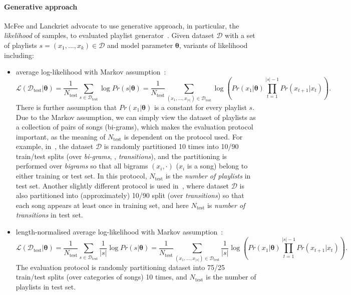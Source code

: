 \paragraph{Generative approach}
McFee and Lanckriet advocate to use generative approach, in particular, the \emph{likelihood} of samples, 
to evaluated playlist generator~\cite{mcfee2011natural}.
Given dataset $\mathcal{D}$ with a set of playlists $s=(x_1, \dots, x_k) \in \mathcal{D}$ and model parameter $\bm{\theta}$, 
variants of likelihood including:
\begin{itemize}
\item average log-likelihood with Markov assumption~\cite{mcfee2011natural,chen2012playlist}:
      \begin{equation*}
      \mathcal{L}(\mathcal{D}_\text{test} | \bm{\theta}) 
      = \frac{1}{N_\text{test}} \sum_{s \in \mathcal{D}_\text{test}} \log Pr(s | \bm{\theta})
      = \frac{1}{N_\text{test}} \sum_{(x_1,\dots,x_{|s|}) \in \mathcal{D}_\text{test}} 
        \log \left( Pr(x_1 |\bm{\theta}) \prod_{t=1}^{|s|-1} Pr(x_{t+1} | x_t) \right).
      \end{equation*}
      There is further assumption that $Pr(x_1 |\bm{\theta})$ is a constant for every playlist $s$.
      Due to the Markov assumption, we can simply view the dataset of playlists as a collection of pairs of songs (bi-grams),
      which makes the evaluation protocol important, as the meaning of $N_\text{test}$ is dependent on the protocol used.
      For example, in~\cite{mcfee2011natural}, 
      the dataset $\mathcal{D}$ is randomly partitioned 10 times into 10/90 train/test splits (over \emph{bi-grams}, \ie, \emph{transitions}),
      and the partitioning is performed over \emph{bigrams} so that all bigrams $(x_i, \cdot)$ ($x_i$ is a song) belong to either training or test set.
      In this protocol, $N_\text{test}$ is the \emph{number of playlists} in test set.
      Another slightly different protocol is used in~\cite{chen2012playlist}, 
      where dataset $\mathcal{D}$ is also partitioned into (approximately) 10/90 split (over \emph{transitions}) 
      so that each song appears at least once in training set,
      and here $N_\text{test}$ is \emph{number of transitions} in test set.      
\item length-normalised average log-likelihood with Markov assumption~\cite{mcfee2012hypergraph}:
      \begin{equation*}
      \mathcal{L}(\mathcal{D}_\text{test} | \bm{\theta}) 
      = \frac{1}{N_\text{test}} \sum_{s \in \mathcal{D}_\text{test}} \frac{1}{|s|} \log Pr(s | \bm{\theta})
      = \frac{1}{N_\text{test}} \sum_{(x_1,\dots,x_{|s|}) \in \mathcal{D}_\text{test}} 
        \frac{1}{|s|} \log \left( Pr(x_1 |\bm{\theta}) \prod_{t=1}^{|s|-1} Pr(x_{t+1} | x_t) \right).
      \end{equation*}
      The evaluation protocol is randomly partitioning dataset into 75/25 train/test splits (over categories of songs) 10 times,
      and $N_\text{test}$ is the number of playlists in test set.
\end{itemize}

